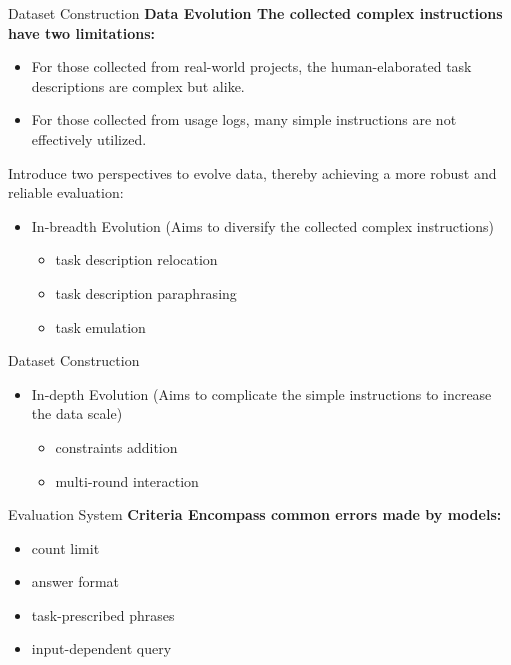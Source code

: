 \documentclass{beamer}
\begin{document}
\begin{frame}{Dataset Construction}
    \large\bfseries{Data Evolution}
    \newline
    \normalfont
    The collected complex instructions have two limitations:
    \begin{itemize}
        \item {For those collected from real-world projects, the human-elaborated task descriptions are complex but alike.}
        \item {For those collected from usage logs, many simple instructions are not effectively utilized.}
    \end{itemize}
    Introduce two perspectives to evolve data, thereby achieving a more robust and reliable evaluation:
    \begin{itemize}
        \item {In-breadth Evolution (Aims to diversify the collected complex instructions)}
            \begin{itemize}
                \item {task description relocation}
                \item {task description paraphrasing}
                \item {task emulation}
            \end{itemize}

    \end{itemize}
\end{frame}

\begin{frame}{Dataset Construction}
    \begin{itemize}
        \item {In-depth Evolution (Aims to complicate the simple instructions to increase the data scale)}
            \begin{itemize}
                \item {constraints addition}
                \item {multi-round interaction}
            \end{itemize}
    \end{itemize}
\end{frame}

\begin{frame}{Evaluation System}
    \large\bfseries{Criteria}
    \newline
    \normalfont
    Encompass common errors made by models:
    \begin{itemize}
        \item {count limit}
        \item {answer format}
        \item {task-prescribed phrases}
        \item {input-dependent query}
    \end{itemize}
\end{frame}
\end{document}

